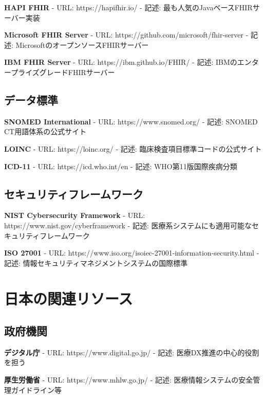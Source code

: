 \documentclass[
  a4paper,
  a4paper,
  11pt]{ltjsbook}
\begin{document}
\textbf{HAPI FHIR} - URL: https://hapifhir.io/ - 記述:
最も人気のJavaベースFHIRサーバー実装

\textbf{Microsoft FHIR Server} - URL:
https://github.com/microsoft/fhir-server - 記述:
MicrosoftのオープンソースFHIRサーバー

\textbf{IBM FHIR Server} - URL: https://ibm.github.io/FHIR/ - 記述:
IBMのエンタープライズグレードFHIRサーバー

\subsection{データ標準}\label{ux30c7ux30fcux30bfux6a19ux6e96}

\textbf{SNOMED International} - URL: https://www.snomed.org/ - 記述:
SNOMED CT用語体系の公式サイト

\textbf{LOINC} - URL: https://loinc.org/ - 記述:
臨床検査項目標準コードの公式サイト

\textbf{ICD-11} - URL: https://icd.who.int/en - 記述:
WHO第11版国際疾病分類

\subsection{セキュリティフレームワーク}\label{ux30bbux30adux30e5ux30eaux30c6ux30a3ux30d5ux30ecux30fcux30e0ux30efux30fcux30af}

\textbf{NIST Cybersecurity Framework} - URL:
https://www.nist.gov/cyberframework - 記述:
医療系システムにも適用可能なセキュリティフレームワーク

\textbf{ISO 27001} - URL:
https://www.iso.org/isoiec-27001-information-security.html - 記述:
情報セキュリティマネジメントシステムの国際標準

\section{日本の関連リソース}\label{ux65e5ux672cux306eux95a2ux9023ux30eaux30bdux30fcux30b9}

\subsection{政府機関}\label{ux653fux5e9cux6a5fux95a2}

\textbf{デジタル庁} - URL: https://www.digital.go.jp/ - 記述:
医療DX推進の中心的役割を担う

\textbf{厚生労働省} - URL: https://www.mhlw.go.jp/ - 記述:
医療情報システムの安全管理ガイドライン等
\end{document}
